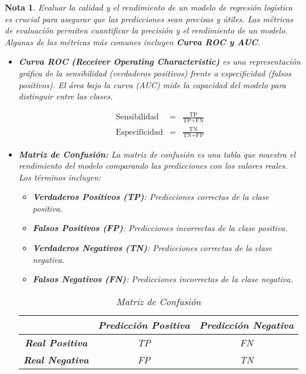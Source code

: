 \documentclass[12pt]{article}
\newtheorem{Note}{Nota}%
\begin{document}
\begin{Note} Evaluar la calidad y el rendimiento de un modelo de regresión logística es crucial para asegurar que las predicciones sean precisas y útiles. Las métricas de evaluación permiten cuantificar la precisión y el rendimiento de un modelo. Algunas de las métricas más comunes incluyen \textbf{Curva ROC y AUC}. 
\medskip

\begin{itemize}
\item \textbf{Curva ROC (Receiver Operating Characteristic)} es una representación gráfica de la sensibilidad (verdaderos positivos) frente a especificidad (falsos positivos). El área bajo la curva (AUC) mide la capacidad del modelo para distinguir entre las clases.

\begin{eqnarray}
\text{Sensibilidad} &=& \frac{\text{TP}}{\text{TP} + \text{FN}} \\
\text{Especificidad} &=& \frac{\text{TN}}{\text{TN} + \text{FP}}
\end{eqnarray}


\item \textbf{Matriz de Confusión:} La matriz de confusión es una tabla que muestra el rendimiento del modelo comparando las predicciones con los valores reales. Los términos incluyen:
\begin{itemize}
    \item \textbf{Verdaderos Positivos (TP)}: Predicciones correctas de la clase positiva.
    \item \textbf{Falsos Positivos (FP)}: Predicciones incorrectas de la clase positiva.
    \item \textbf{Verdaderos Negativos (TN)}: Predicciones correctas de la clase negativa.
    \item \textbf{Falsos Negativos (FN)}: Predicciones incorrectas de la clase negativa.
\end{itemize}

\begin{table}[h]
\centering
\begin{tabular}{|c|c|c|}
\hline
 & \textbf{Predicción Positiva} & \textbf{Predicción Negativa} \\
\hline
\textbf{Real Positiva} & TP & FN \\
\hline
\textbf{Real Negativa} & FP & TN \\
\hline
\end{tabular}
\caption{Matriz de Confusión}
\label{tab:confusion_matrix}
\end{table}


\end{itemize}
\end{Note}
\end{document}
